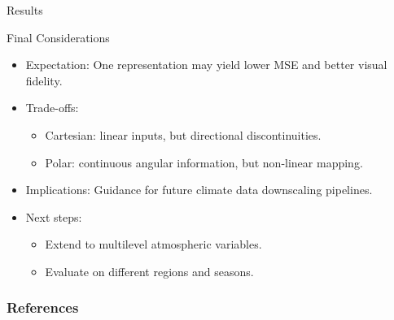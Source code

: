 \documentclass[footline=authortitle]{beamer}
\begin{document}
\begin{frame}{Results}
\end{frame}

\begin{frame}{Final Considerations}
  \begin{itemize}
    \item Expectation: One representation may yield lower MSE and better visual fidelity.
    \item Trade-offs:
      \begin{itemize}
        \item Cartesian: linear inputs, but directional discontinuities.
        \item Polar: continuous angular information, but non-linear mapping.
      \end{itemize}
    \item Implications: Guidance for future climate data downscaling pipelines.
    \item Next steps:
      \begin{itemize}
        \item Extend to multilevel atmospheric variables.
        \item Evaluate on different regions and seasons.
      \end{itemize}
  \end{itemize}
\end{frame}

\begin{frame}
    \frametitle{References}
    \printbibliography
\end{frame}
\end{document}
